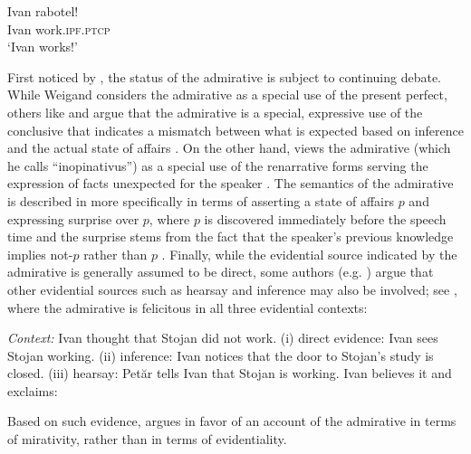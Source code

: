 \documentclass[output=paper,
colorlinks,
citecolor=brown,
newtxmath
]{langscibook}
\begin{document}
\ea\label{admir}
\gll Ivan rabotel! \\
Ivan work.\textsc{ipf.ptcp} \\
\glt `Ivan works!'
\z

\noindent First noticed by \citet{Weigand1923/1925}, the status of the admirative is subject to continuing debate. While Weigand considers the admirative as a special use of the present perfect, others like \citet{Aleksova2003} and \citet{Kim.Aleksova2003} argue that the admirative is a special, expressive use of the conclusive that indicates a mismatch between what is expected based on inference and the actual state of affairs \citep[see also][]{Besevliev1928,Ivancev1976,Guentcheva1990}. On the other hand, \citet{Andrejcin1938} views the admirative (which he calls ``inopinativus'') as a special use of the renarrative forms serving the expression of facts unexpected for the speaker \citep[see also][]{Nicolova1993,Bojadziev.etal1999,Hauge1999}. The semantics of the admirative is described in \citet{Nicolova2013} more specifically in terms of asserting a state of affairs $p$ and expressing surprise over $p$, where $p$ is discovered immediately before the speech time and the surprise stems from the fact that the speaker's previous knowledge implies not-$p$ rather than $p$ \citep[see also][]{Guentcheva1990}.
Finally, while the evidential source indicated by the admirative is generally assumed to be direct, some authors (e.g. \citealt{Aleksova2001,Kim.Aleksova2003,Simeonova2015})  argue that other evidential sources such as hearsay and inference may also be involved; see , where the admirative is felicitous in all three evidential contexts:

\eanoraggedright \label{ex:Simeonova}
\textit{Context:} Ivan thought that Stojan did not work. (i) direct evidence: Ivan sees Stojan working.
(ii) inference: Ivan notices that the door to Stojan's study is closed.
(iii) hearsay: Petăr tells Ivan that Stojan is working.
Ivan believes it and exclaims:\vspace{-6pt}
\z
\begin{exe}
\end{exe}


\noindent Based on such evidence, \citet{Simeonova2015} argues in favor of an account of the admirative in terms of mirativity, rather than in terms of evidentiality.
\end{document}

